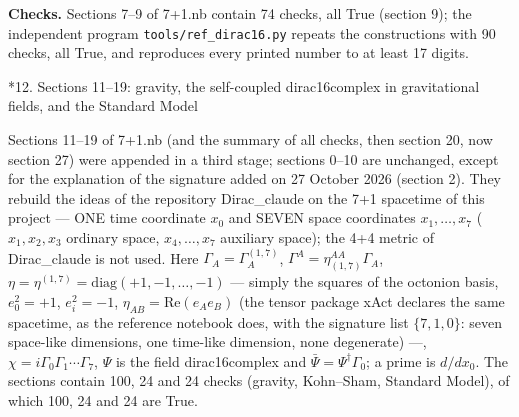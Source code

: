 \documentclass[10pt,a4paper]{article}
\makeatletter
\renewcommand\section{\@startsection{section}{1}{\z@}{-3.5ex \@plus -1ex \@minus -.2ex}{2.3ex \@plus.2ex}{\normalfont\Large\bfseries\raggedright}}
\makeatother
\begin{document}
\textbf{Checks.} Sections 7–9 of 7+1.nb contain 74 checks, all True (section 9); the independent program \texttt{tools/\allowbreak{}ref\_\allowbreak{}dirac16.py} repeats the constructions with 90 checks, all True, and reproduces every printed number to at least 17 digits.

\section*{12. Sections 11–19: gravity, the self-coupled dirac16complex in gravitational fields, and the Standard Model}
Sections 11–19 of 7+1.nb (and the summary of all checks, then section 20, now section 27) were appended in a third stage; sections 0–10 are unchanged, except for the explanation of the signature added on 27 October 2026 (section 2). They rebuild the ideas of the repository Dirac\_claude on the 7+1 spacetime of this project — ONE time coordinate $x_0$ and SEVEN space coordinates $x_1,\dots,x_7$ ($x_1,x_2,x_3$ ordinary space, $x_4,\dots,x_7$ auxiliary space); the 4+4 metric of Dirac\_claude is not used. Here $\Gamma_A=\Gamma^{(1,7)}_A$, $\Gamma^A=\eta_{(1,7)}^{AA}\Gamma_A$, $\eta=\eta^{(1,7)}=\mathrm{diag}(+1,-1,\dots,-1)$ — simply the squares of the octonion basis, $e_0^2=+1$, $e_i^2=-1$, $\eta_{AB}=\mathrm{Re}(e_Ae_B)$ (the tensor package xAct declares the same spacetime, as the reference notebook does, with the signature list $\{7,1,0\}$: seven space-like dimensions, one time-like dimension, none degenerate) —, $\chi=i\Gamma_0\Gamma_1\cdots\Gamma_7$, $\Psi$ is the field dirac16complex and $\bar\Psi=\Psi^\dagger\Gamma_0$; a prime is $d/dx_0$. The sections contain 100, 24 and 24 checks (gravity, Kohn–Sham, Standard Model), of which 100, 24 and 24 are True.
\end{document}
